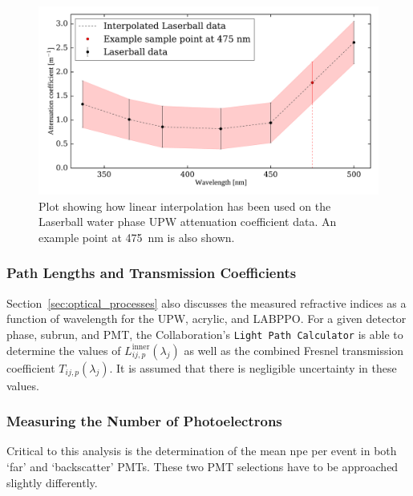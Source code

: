 \begin{figure}
    \centering
    \includegraphics[width=\textwidth]{5_SMELLIEAnalysis/images/OCA_water_atten_coeffs_with_interploation.pdf}
    \caption[Linear interpolation being used on Laserball UPW attenuation coefficient data]
    {Plot showing how linear interpolation has been used on the Laserball water phase UPW attenuation coefficient data. An example point at \SI{475}{\nm} is also shown.}
    \label{fig:smellie_laserball_water_ext_length_est}
\end{figure}

\subsubsection{Path Lengths and Transmission Coefficients}
Section~\ref{sec:optical_processes} also discusses the measured refractive indices as a function of wavelength for the UPW, acrylic, and LABPPO. For a given detector phase, subrun, and PMT, the Collaboration's \texttt{Light Path Calculator} is able to determine the values of $L_{ij,p}^{\mathrm{inner}}(\lambda_{j})$ as well as the combined Fresnel transmission coefficient $T_{ij,p}(\lambda_{j})$. It is assumed that there is negligible uncertainty in these values.

\subsubsection{Measuring the Number of Photoelectrons}
Critical to this analysis is the determination of the mean npe per event in both `far' and `backscatter' PMTs. These two PMT selections have to be approached slightly differently.

